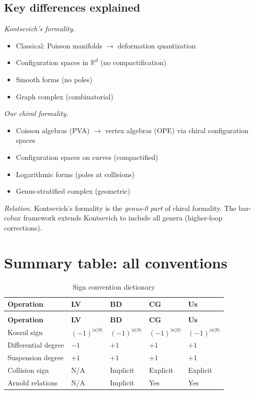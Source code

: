 \subsection{Key differences explained}

\emph{Kontsevich's formality.}
\begin{itemize}
\item Classical: Poisson manifolds $\to$ deformation quantization
\item Configuration spaces in $\mathbb{R}^d$ (no compactification)
\item Smooth forms (no poles)
\item Graph complex (combinatorial)
\end{itemize}

\emph{Our chiral formality.}
\begin{itemize}
\item Coisson algebras (PVA) $\to$ vertex algebras (OPE) via chiral configuration spaces
\item Configuration spaces on curves (compactified)
\item Logarithmic forms (poles at collisions)
\item Genus-stratified complex (geometric)
\end{itemize}

\emph{Relation.} Kontsevich's formality is the \emph{genus-0 part} of chiral formality. The bar-cobar framework extends Kontsevich to include all genera (higher-loop corrections).

\section{Summary table: all conventions}

\begin{center}
\begin{longtable}{|>{\raggedright\arraybackslash}p{5cm}|>{\raggedright\arraybackslash}p{2cm}|>{\raggedright\arraybackslash}p{2cm}|>{\raggedright\arraybackslash}p{2cm}|>{\raggedright\arraybackslash}p{2cm}|}
\caption{Sign convention dictionary} \\
\hline
\textbf{Operation} & \textbf{LV} & \textbf{BD} & \textbf{CG} & \textbf{Us} \\
\hline
\endfirsthead
\multicolumn{5}{c}{\tablename\ \thetable\ -- \textit{Continued}} \\
\hline
\textbf{Operation} & \textbf{LV} & \textbf{BD} & \textbf{CG} & \textbf{Us} \\
\hline
\endhead
Koszul sign & $(-1)^{|a||b|}$ & $(-1)^{|a||b|}$ & $(-1)^{|a||b|}$ & $(-1)^{|a||b|}$ \\
Differential degree & $-1$ & $+1$ & $+1$ & $+1$ \\
Suspension degree & $+1$ & $+1$ & $+1$ & $+1$ \\
Collision sign & N/A & Implicit & Explicit & Explicit \\
Arnold relations & N/A & Implicit & Yes & Yes \\
\hline
\end{longtable}
\end{center}

